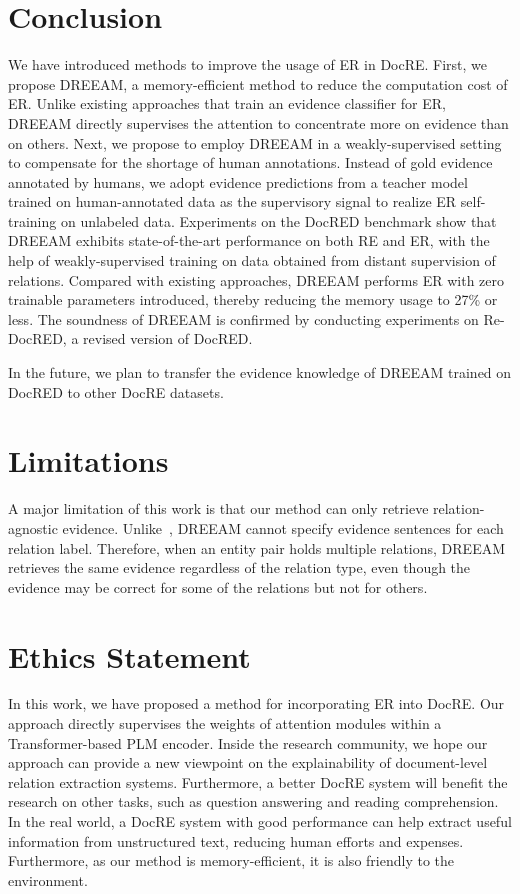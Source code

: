 \documentclass[11pt]{article}
\begin{document}
\section{Conclusion}
We have introduced methods to improve the usage of ER in DocRE.
First, we propose DREEAM, a memory-efficient method to reduce the computation cost of ER.
Unlike existing approaches that train an evidence classifier for ER, DREEAM directly supervises the attention to concentrate more on evidence than on others.
Next, we propose to employ DREEAM in a weakly-supervised setting to compensate for the shortage of human annotations.
Instead of gold evidence annotated by humans, we adopt evidence predictions from a teacher model trained on human-annotated data as the supervisory signal to realize ER self-training on unlabeled data.
Experiments on the DocRED benchmark show that DREEAM exhibits state-of-the-art performance on both RE and ER, with the help of weakly-supervised training on data obtained from distant supervision of relations. 
Compared with existing approaches, DREEAM performs ER with zero trainable parameters introduced, thereby reducing the memory usage to 27\% or less.
The soundness of DREEAM is confirmed by conducting experiments on Re-DocRED, a revised version of DocRED.

In the future, we plan to transfer the evidence knowledge of DREEAM trained on DocRED to other DocRE datasets. 

\section*{Limitations}
A major limitation of this work is that our method can only retrieve relation-agnostic evidence.
Unlike~\citet{xiao-etal-2022-sais}, DREEAM cannot specify evidence sentences for each relation label.
Therefore, when an entity pair holds multiple relations, DREEAM retrieves the same evidence regardless of the relation type, even though the evidence may be correct for some of the relations but not for others.


\section*{Ethics Statement}
In this work, we have proposed a method for incorporating ER into DocRE.
Our approach directly supervises the weights of attention modules within a Transformer-based PLM encoder. Inside the research community, we hope our approach can provide a new viewpoint on the explainability of document-level relation extraction systems.
Furthermore, a better DocRE system will benefit the research on other tasks, such as question answering and reading comprehension.
In the real world, a DocRE system with good performance can help extract useful information from unstructured text, reducing human efforts and expenses. 
Furthermore, as our method is memory-efficient, it is also friendly to the environment.
\end{document}
